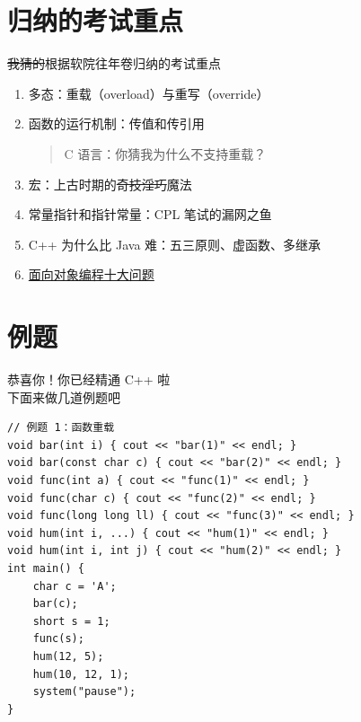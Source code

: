 \documentclass[10pt,aspectratio=169,mathserif]{beamer}
\begin{document}
\section{归纳的考试重点}
\begin{frame}{\sout{我猜的}根据软院往年卷归纳的考试重点}

    \begin{enumerate}
        \def\labelenumi{\arabic{enumi}.}
        \item
              多态：重载（overload）与重写（override）
        \item
              函数的运行机制：传值和传引用

              \begin{quote}
                  C 语言：你猜我为什么不支持重载？
              \end{quote}
        \item
              宏：上古时期的\sout{奇技淫巧}魔法
        \item
              常量指针和指针常量：CPL 笔试的漏网之鱼
        \item
              C++ 为什么比 Java 难：五三原则、虚函数、多继承
        \item
              \href{https://eaglebear2002.github.io/2022Spring-C++\%20\%E9\%AB\%98\%E7\%BA\%A7\%E7\%A8\%8B\%E5\%BA\%8F\%E8\%AE\%BE\%E8\%AE\%A1/C++\%20\%E9\%AB\%98\%E7\%BA\%A7\%E7\%A8\%8B\%E5\%BA\%8F\%E8\%AE\%BE\%E8\%AE\%A1-25-\%E9\%9D\%A2\%E5\%90\%91\%E5\%AF\%B9\%E8\%B1\%A1\%E7\%BC\%96\%E7\%A8\%8B\%E5\%8D\%81\%E5\%A4\%A7\%E9\%97\%AE\%E9\%A2\%98/}{面向对象编程十大问题}
    \end{enumerate}
\end{frame}

\section{例题}
\begin{frame}
    \vfill
    \centering
    \Large 恭喜你！你已经精通 C++ 啦\\
    下面来做几道例题吧
    \vfill
\end{frame}

\begin{frame}[fragile]
    \begin{lstlisting}
// 例题 1：函数重载
void bar(int i) { cout << "bar(1)" << endl; }
void bar(const char c) { cout << "bar(2)" << endl; }
void func(int a) { cout << "func(1)" << endl; }
void func(char c) { cout << "func(2)" << endl; }
void func(long long ll) { cout << "func(3)" << endl; }
void hum(int i, ...) { cout << "hum(1)" << endl; }
void hum(int i, int j) { cout << "hum(2)" << endl; }
int main() {
    char c = 'A';
    bar(c);
    short s = 1;
    func(s);
    hum(12, 5);
    hum(10, 12, 1);
    system("pause");
}
\end{lstlisting}
\end{frame}
\end{document}
